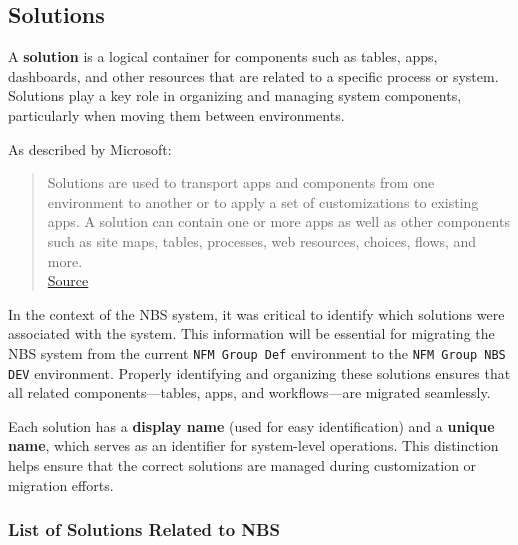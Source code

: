 

\subsection{Solutions}

A \textbf{solution} is a logical container for components such as tables, apps, dashboards, and other resources that are related to a specific process or system. Solutions play a key role in organizing and managing system components, particularly when moving them between environments.

As described by Microsoft:

\begin{quote}
	Solutions are used to transport apps and components from one environment to another or to apply a set of customizations to existing apps. A solution can contain one or more apps as well as other components such as site maps, tables, processes, web resources, choices, flows, and more. \\
	\href{https://learn.microsoft.com/en-us/power-apps/maker/data-platform/solutions-overview}{Source}
\end{quote}

In the context of the NBS system, it was critical to identify which solutions were associated with the system. This information will be essential for migrating the NBS system from the current \texttt{NFM Group Def} environment to the \texttt{NFM Group NBS DEV} environment. Properly identifying and organizing these solutions ensures that all related components—tables, apps, and workflows—are migrated seamlessly.

Each solution has a \textbf{display name} (used for easy identification) and a \textbf{unique name}, which serves as an identifier for system-level operations. This distinction helps ensure that the correct solutions are managed during customization or migration efforts.

\subsubsection{List of Solutions Related to NBS}

